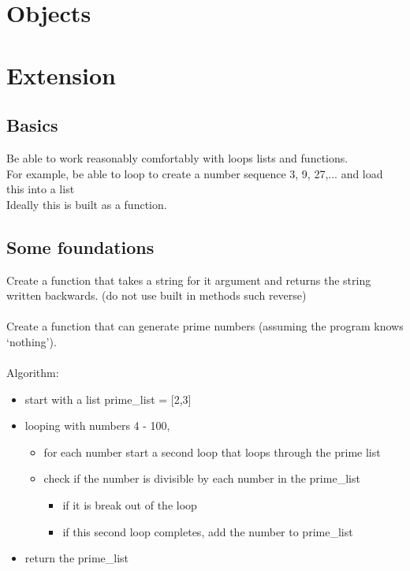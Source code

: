\documentclass[a4paper,12pt]{article}
\begin{document}
\section{Objects}






\newpage

\section{Extension}
\subsection{Basics}
Be able to work reasonably comfortably with loops lists and functions.\\
For example, be able to loop to create a number sequence 3, 9, 27,... and load this into a list\\
Ideally this is built as a function.
\subsection{Some foundations}
Create a function that takes a string for it argument and returns the string written backwards. (do not use built in methods such reverse)\\\\

Create a function that can generate prime numbers (assuming the program knows `nothing').\\\\
Algorithm:
\begin{itemize}
	\item start with a list prime\_list = [2,3]
	\item looping with numbers 4 - 100, 
	\begin{itemize}
		\item for each number start a second loop that loops through the prime list
		\item check if the number is divisible by each number in the prime\_list 
		\begin{itemize}
			\item 	if it is break out of the loop
			\item if this second loop completes, add the number to prime\_list
		\end{itemize}
	\end{itemize}
\item return the prime\_list
\end{itemize}
\end{document}
